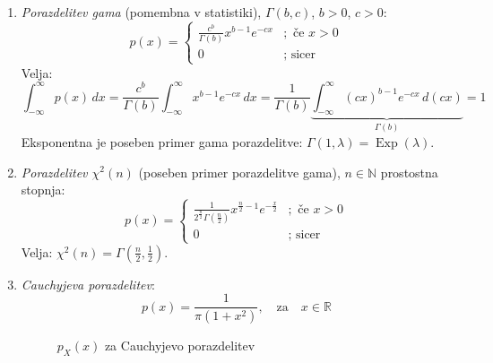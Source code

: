 \documentclass[12pt]{book}
\theoremstyle{definition}
\theoremstyle{plain}
\theoremstyle{plain}
\theoremstyle{plain}
\theoremstyle{remark}
\begin{document}
\begin{enumerate}
    \item \emph{Porazdelitev gama} (pomembna v statistiki), $\Gamma(b,c)$, $b>0$, $c>0$:
    $$
    p(x)= \begin{cases}\frac{c^b}{\Gamma(b)} x^{b-1} e^{-c x} &; \text { če } x>0 \\ 0 &; \text { sicer }\end{cases}
    $$
    Velja: 
    $$
    \int_{-\infty}^{\infty} p(x) \, d x=\frac{c^b}{\Gamma(b)} \int_{-\infty}^{\infty} x^{b-1} e^{-c x} \, d x=\frac{1}{\Gamma(b)} \underbrace{\int_{-\infty}^{\infty} (c x)^{b-1} e^{-c x} \, d(c x)}_{\Gamma(b)}=1
    $$
    Eksponentna je poseben primer gama porazdelitve: $\Gamma(1,\lambda) = \operatorname{Exp}(\lambda)$.

    \item \emph{Porazdelitev $\chi^2(n)$} (poseben primer porazdelitve gama), $n \in \mathbb{N}$ prostostna stopnja:
    $$
    p(x)=\begin{cases}
        \frac{1}{2^{\frac{n}{2}} \Gamma\left(\frac{n}{2}\right)} x^{\frac{n}{2}-1} e^{-\frac{x}{2}} &; \text { če } x>0 \\
        0 &; \text { sicer }
        \end{cases}
    $$
    Velja: $\chi^2(n)=\Gamma\left(\frac{n}{2}, \frac{1}{2}\right)$.
    \item \emph{Cauchyjeva porazdelitev}:
    $$
    p(x)=\frac{1}{\pi \left(1+x^2\right)}, \quad \text{za} \quad x \in \mathbb{R}
    $$
    \begin{figure}[H]
        \centering

        \caption{$p_X(x)$ za Cauchyjevo porazdelitev}
        \label{fig:18}
    \end{figure}


\end{enumerate}
\end{document}
